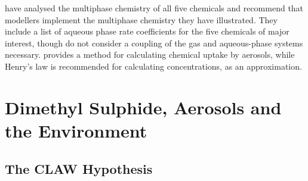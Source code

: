 	\citet{barnes:2006ug} have analysed the multiphase chemistry of all five chemicals and recommend that modellers implement the multiphase chemistry they have illustrated. They include a list of aqueous phase rate coefficients for the five chemicals of major interest, though do not consider a coupling of the gas and aqueous-phase systems necessary. \citet{jacob2000heterogeneous} provides a method for calculating chemical uptake by aerosols, while Henry's law is recommended for calculating concentrations, as an approximation.
	


	\section{Dimethyl Sulphide, Aerosols and the Environment}
	\label{sec:daande}



		\subsection{The CLAW Hypothesis}
		\label{subsec:clawhyp}

